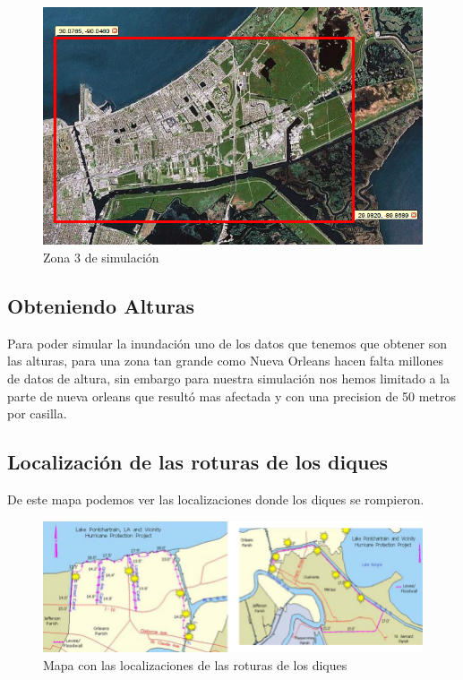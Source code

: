 \begin{figure}[H]
 \centering
 \includegraphics[width=135mm]{figuras/cap6/NOarea4.png}
 \caption{Zona 3 de simulación}
\end{figure}


\subsection*{Obteniendo Alturas}

Para poder simular la inundación uno de los datos que tenemos que obtener son
las alturas, para una zona tan grande como Nueva Orleans hacen falta millones
de datos de altura, sin embargo para nuestra simulación nos hemos limitado a la
parte de nueva orleans que resultó mas afectada y con una precision de 50
metros por casilla.

\subsection*{Localización de las roturas de los diques}

De este mapa podemos ver las localizaciones donde los diques se rompieron.

\begin{figure}[H]
 \centering
 \includegraphics[width=135mm]{figuras/cap6/dikes.png}
 \caption{Mapa con las localizaciones de las roturas de los diques}
\end{figure}

